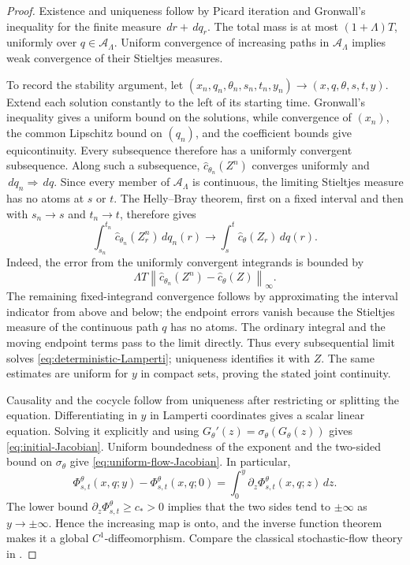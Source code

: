 \documentclass[11pt,reqno]{amsart}
\theoremstyle{plain}
\theoremstyle{definition}
\newcommand{\cA}{\mathcal A}
\newcommand{\dd}{\,d}
\newcommand{\norm}[1]{\left\lVert #1\right\rVert}
\begin{document}
\begin{proof}
Existence and uniqueness follow by Picard iteration and Gronwall's inequality
for the finite measure \(\dd r+\dd q_r\).  The total mass is at most
\((1+\Lambda)T\), uniformly over \(q\in\cA_\Lambda\).  Uniform convergence
of increasing paths in \(\cA_\Lambda\) implies weak convergence of their
Stieltjes measures.

To record the stability argument, let
\((x_n,q_n,\theta_n,s_n,t_n,y_n)\to(x,q,\theta,s,t,y)\).  Extend each solution
constantly to the left of its starting time.  Gronwall's inequality gives a
uniform bound on the solutions, while convergence of \((x_n)\), the common
Lipschitz bound on \((q_n)\), and the coefficient bounds give
equicontinuity.  Every subsequence therefore has a uniformly convergent
subsequence.  Along such a subsequence,
\(\widehat c_{\theta_n}(Z^n)\) converges uniformly and
\(\dd q_n\Rightarrow\dd q\).  Since every member of \(\cA_\Lambda\) is
continuous, the limiting Stieltjes measure has no atoms at \(s\) or \(t\).
The Helly--Bray theorem, first on a fixed interval and then with
\(s_n\to s\) and \(t_n\to t\), therefore gives
\[
  \int_{s_n}^{t_n}\widehat c_{\theta_n}(Z_r^n)\dd q_n(r)
  \longrightarrow
  \int_s^t\widehat c_\theta(Z_r)\dd q(r).
\]
Indeed, the error from the uniformly convergent integrands is bounded by
\[
  \Lambda T
  \norm{\widehat c_{\theta_n}(Z^n)-\widehat c_\theta(Z)}_\infty.
\]
The remaining fixed-integrand convergence follows by approximating the
interval indicator from above and below; the endpoint errors vanish because
the Stieltjes measure of the continuous path \(q\) has no atoms.
The ordinary integral and the moving endpoint terms pass to the limit
directly.  Thus every subsequential limit solves
\eqref{eq:deterministic-Lamperti}; uniqueness identifies it with \(Z\).
The same estimates are uniform for \(y\) in compact sets, proving the stated
joint continuity.

Causality and the cocycle follow from uniqueness after restricting or
splitting the equation.  Differentiating in \(y\) in Lamperti coordinates
gives a scalar linear equation.  Solving it explicitly and using
\(G_\theta'(z)=\sigma_\theta(G_\theta(z))\) gives
\eqref{eq:initial-Jacobian}.  Uniform boundedness of the exponent and the
two-sided bound on \(\sigma_\theta\) give \eqref{eq:uniform-flow-Jacobian}.
In particular,
\[
  \Phi_{s,t}^\theta(x,q;y)-\Phi_{s,t}^\theta(x,q;0)
  =\int_0^y\partial_z\Phi_{s,t}^\theta(x,q;z)\dd z.
\]
The lower bound \(\partial_z\Phi_{s,t}^\theta\ge c_*>0\) implies that the
two sides tend to \(\pm\infty\) as \(y\to\pm\infty\).  Hence the increasing
map is onto, and the inverse function theorem makes it a global
\(C^1\)-diffeomorphism.  Compare the classical stochastic-flow theory in
\cite{Kunita90}.
\end{proof}
\end{document}
